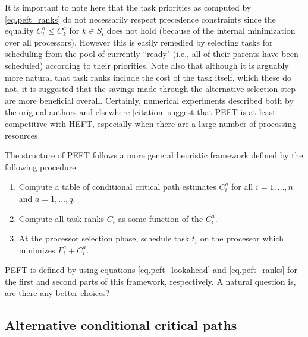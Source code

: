 \documentclass[12pt]{article}
\begin{document}
It is important to note here that the task priorities as computed by \eqref{eq.peft_ranks} do not necessarily respect precedence constraints since the equality $C_i^a \leq C_k^a$ for $k \in S_i$ does not hold (because of the internal minimization over all processors). However this is easily remedied by selecting tasks for scheduling from the pool of currently ``ready" (i.e., all of their parents have been scheduled) according to their priorities. Note also that although it is arguably more natural that task ranks include the cost of the task itself, which these do not, it is suggested that the savings made through the alternative selection step are more beneficial overall. Certainly, numerical experiments described both by the original authors \cite{arabnejad14} and elsewhere [citation] suggest that PEFT is at least competitive with HEFT, especially when there are a large number of processing resources. 

The structure of PEFT follows a more general heuristic framework defined by the following procedure:
 \begin{enumerate}
 	\item Compute a table of conditional critical path estimates $C_i^a$ for all $i = 1, \dots, n$ and $a = 1, \dots, q$.
 	\item Compute all task ranks $C_i$ as some function of the $C_i^a$.
 	\item At the processor selection phase, schedule task $t_i$ on the processor which minimizes $F_i^a + C_i^a$.
 \end{enumerate}
PEFT is defined by using equations \eqref{eq.peft_lookahead} and \eqref{eq.peft_ranks} for the first and second parts of this framework, respectively. A natural question is, are there any better choices? 

\subsection{Alternative conditional critical paths}
\label{subsect.alt_cond_cp}
\end{document}
